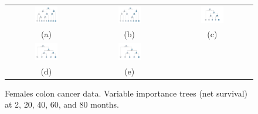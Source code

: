 \documentclass[12pt]{article}
\begin{document}
\begin{figure}[h!]
\centering
\begin{tabular}{c c c}
\includegraphics[width=0.3\textwidth]{rpart1_females.pdf} & 
\includegraphics[width=0.3\textwidth]{rpart10_females.pdf} & 
\includegraphics[width=0.3\textwidth]{rpart20_females.pdf}\\
 (a) & (b) & (c) \\
 \includegraphics[width=0.3\textwidth]{rpart30_females.pdf} & 
\includegraphics[width=0.3\textwidth]{rpart40_females.pdf} & 
\\
 (d) & (e) & 
 \end{tabular}
\caption{ Females colon cancer data. Variable importance trees (net survival) at 2, 20, 40, 60, and 80 months.}
\label{fig:tree_females}
\end{figure}
\end{document}
